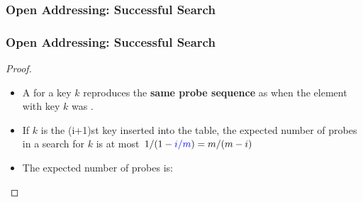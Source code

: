 \documentclass[UTF8,11pt]{beamer}
\begin{document}
\begin{frame}
\frametitle{Open Addressing: Successful Search}

\begin{center}
	\pause
\end{center}
\end{frame}

\begin{frame}
\frametitle{Open Addressing: Successful Search}

\begin{center}
\begin{proof}
	\begin{itemize}
		\pause\item A \textbf{} for a key $k$ reproduces the \textbf{same probe sequence} as when the element with key $k$ was \textbf{}.
		\pause\item If $k$ is the (i+1)st key inserted into the table, the expected number of probes in a search for $k$ is at most $1/(1-\textcolor{blue}{i/m})=m/(m-i)$
		\pause\item The expected number of probes is:

	\end{itemize}
\end{proof}
\end{center}
\end{frame}
\end{document}
